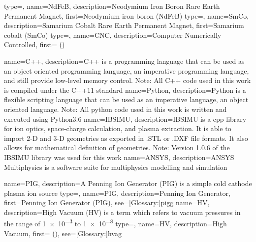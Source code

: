 {
    type=\acronymtype,
    name={NdFeB},
    description={Neodymium Iron Boron Rare Earth Permanent Magnet},
    first={Neodymium iron boron (NdFeB)}
}
{
    type=\acronymtype,
    name={SmCo},
    description={Samarium Cobalt Rare Earth Permanent Magnet},
    first={Samarium cobalt (SmCo)}
}
{
    type=\acronymtype,
    name={CNC},
    description={Computer Numerically Controlled},
    first={ ()}
}

{%
    name={C++},
    description={C++ is a programming language that can be used as an object oriented programming language, an imperative programming language, and still provide low-level memory control. Note: All C++ code used in this work is compiled under the C++11 standard}
}
{%
    name={Python},
    description={Python is a flexible scripting language that can be used as an imperative language, an object oriented language. Note: All python code used in this work is written and executed using Python3.6}
}
{%
    name={IBSIMU},
    description={IBSIMU is a \gls{cpp} library for ion optics, space-charge calculation, and plasma extraction. It is able to import 2-D and 3-D geometries as exported in .STL or .DXF file formats. It also allows for mathematical definition of geometries. Note: Version 1.0.6 of the IBSIMU library was used for this work \cite{acc:14}}
}
{
    name={ANSYS},
    description={ANSYS Multiphysics is a software suite for multiphysics modelling and simulation}
}

{%
 name={PIG},
 description={A Penning Ion Generator (PIG) is a simple cold cathode plasma ion source}
}
{%
 type=\acronymtype,
 name={PIG},
 description={Penning Ion Generator},
 first={Penning Ion Generator (PIG)},
 see=[Glossary:]{pigg}
}
{%
 name={HV},
 description={High Vacuum (HV) is a term which refers to vacuum pressures in the range of \SI{1e-3}{\torr} to \SI{1e-8}{\torr}\cite{acc:13}}
}
{%
 type=\acronymtype,
 name={HV},
 description={High Vacuum},
 first={ ()},
 see=[Glossary:]{hvag}
}


